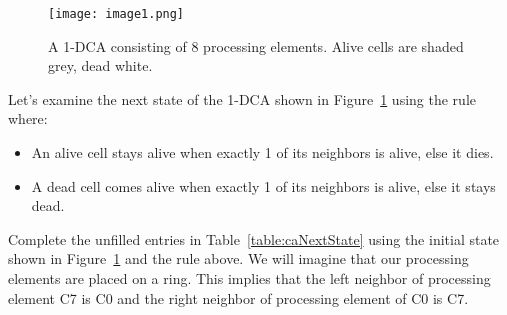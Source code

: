 \begin{figure}[ht]
    \texttt{[image: image1.png]}
    \caption{A 1-DCA consisting of 8 processing elements. Alive cells are
    shaded grey, dead white.}
    \label{fig:exampleCA}
\end{figure}

Let's examine the next state of the 1-DCA shown in Figure~\ref{fig:exampleCA}
using the rule where:

\begin{itemize}
    \item
        An alive cell stays alive when exactly 1 of its neighbors is alive,
        else it dies.
    \item
        A dead cell comes alive when exactly 1 of its neighbors is alive, else
        it stays dead.
\end{itemize}

Complete the unfilled entries in Table~\ref{table:caNextState} using the initial state shown
in Figure~\ref{fig:exampleCA} and the rule above. We will imagine that our processing
elements are placed on a ring. This implies that the left neighbor of
processing element C7 is C0 and the right neighbor of processing element
of C0 is C7.

